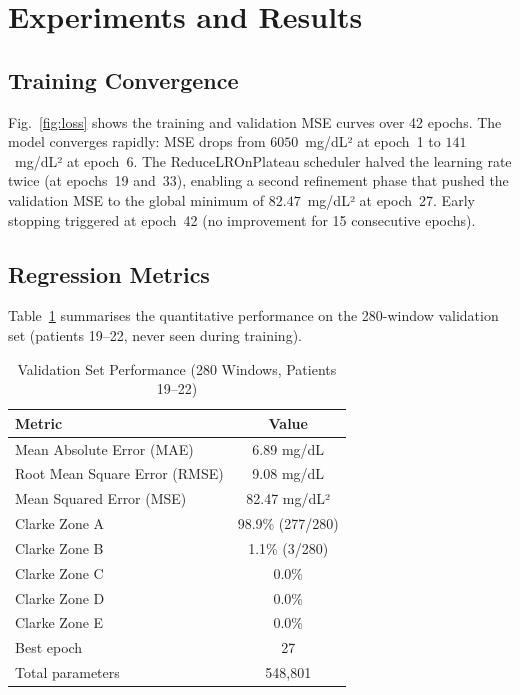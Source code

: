 \documentclass[conference]{IEEEtran}
\begin{document}
\section{Experiments and Results}
\label{sec:results}

\subsection{Training Convergence}
Fig.~\ref{fig:loss} shows the training and validation MSE curves over 42
epochs.  The model converges rapidly: MSE drops from $6050$~mg/dL² at epoch~1
to $141$~mg/dL² at epoch~6.  The ReduceLROnPlateau scheduler halved the
learning rate twice (at epochs~19 and~33), enabling a second refinement phase
that pushed the validation MSE to the global minimum of $82.47$~mg/dL²
at epoch~27.  Early stopping triggered at epoch~42 (no improvement for
15 consecutive epochs).

\subsection{Regression Metrics}
Table~\ref{tab:metrics} summarises the quantitative performance on the
280-window validation set (patients 19--22, never seen during training).

\begin{table}[htbp]
  \caption{Validation Set Performance (280 Windows, Patients 19--22)}
  \label{tab:metrics}
  \centering
  \begin{tabular}{lc}
    \toprule
    \textbf{Metric} & \textbf{Value} \\
    \midrule
    Mean Absolute Error (MAE)     & 6.89 mg/dL  \\
    Root Mean Square Error (RMSE) & 9.08 mg/dL  \\
    Mean Squared Error (MSE)      & 82.47 mg/dL² \\
    Clarke Zone A                 & 98.9\% (277/280) \\
    Clarke Zone B                 & 1.1\%  (3/280)   \\
    Clarke Zone C                 & 0.0\%             \\
    Clarke Zone D                 & 0.0\%             \\
    Clarke Zone E                 & 0.0\%             \\
    Best epoch                    & 27                \\
    Total parameters              & 548,801           \\
    \bottomrule
  \end{tabular}
\end{table}
\end{document}
